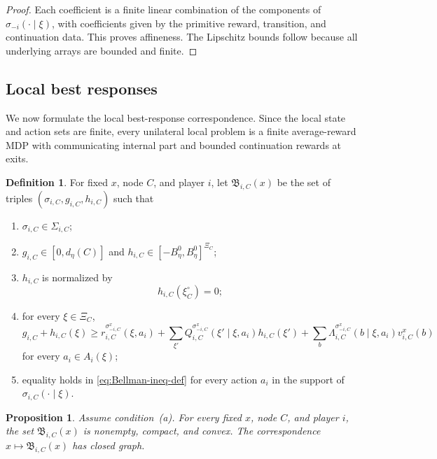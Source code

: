 \documentclass[12pt]{article}
\newtheorem{proposition}[theorem]{Proposition}
\theoremstyle{definition}
\newtheorem{definition}[theorem]{Definition}
\newcommand{\1}{\mathbf{1}}
\begin{document}
\begin{proof}
Each coefficient is a finite linear combination of the components of
$\sigma_{-i}(\cdot\mid\xi)$, with coefficients given by the primitive reward,
transition, and continuation data. This proves affineness. The Lipschitz bounds
follow because all underlying arrays are bounded and finite.
\end{proof}

\subsection{Local best responses}

We now formulate the local best-response correspondence. Since the local state and
action sets are finite, every unilateral local problem is a finite average-reward
MDP with communicating internal part and bounded continuation rewards at exits.

\begin{definition}
\label{def:local-BR-set}
For fixed $x$, node $C$, and player $i$, let $\mathfrak B_{i,C}(x)$ be the set of
triples $(\sigma_{i,C},g_{i,C},h_{i,C})$ such that
\begin{enumerate}[label=\textnormal{(BR\arabic*)},leftmargin=2.9em]
\item $\sigma_{i,C}\in \Sigma_{i,C}$;
\item $g_{i,C}\in[0,d_\eta(C)]$ and
$h_{i,C}\in[-B_\eta^0,B_\eta^0]^{\Xi_C}$;
\item $h_{i,C}$ is normalized by
\[
h_{i,C}(\xi_C^\circ)=0;
\]
\item for every $\xi\in\Xi_C$,
\begin{equation}
\label{eq:Bellman-ineq-def}
g_{i,C}+h_{i,C}(\xi)
\ge
r_{i,C}^{\sigma_{-i,C}^x}(\xi,a_i)
+
\sum_{\xi'}Q_{i,C}^{\sigma_{-i,C}^x}(\xi'\mid\xi,a_i)h_{i,C}(\xi')
+
\sum_b \Lambda_{i,C}^{\sigma_{-i,C}^x}(b\mid\xi,a_i)v_{i,C}^x(b)
\end{equation}
for every $a_i\in A_i(\xi)$;
\item equality holds in \eqref{eq:Bellman-ineq-def} for every action $a_i$ in the
support of $\sigma_{i,C}(\cdot\mid\xi)$.
\end{enumerate}
\end{definition}

\begin{proposition}
\label{prop:local-BR}
Assume condition~\textnormal{(a)}. For every fixed $x$, node $C$, and player $i$,
the set $\mathfrak B_{i,C}(x)$ is nonempty, compact, and convex. The
correspondence $x\mapsto \mathfrak B_{i,C}(x)$ has closed graph.
\end{proposition}
\end{document}
